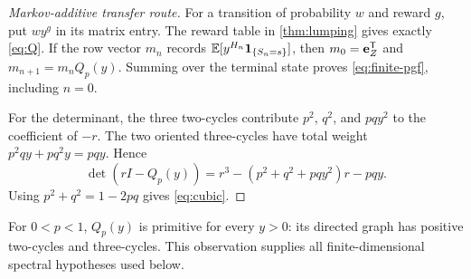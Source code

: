 \begin{proof}[Markov-additive transfer route]
For a transition of probability $w$ and reward $g$, put $wy^g$ in its
matrix entry.  The reward table in \cref{thm:lumping} gives exactly
\eqref{eq:Q}.  If the row vector $m_n$ records
$\mathbb{E}[y^{H_n}\mathbf 1_{\{S_n=s\}}]$, then
$m_0=\mathbf e_{Z}^{\mathsf T}$ and $m_{n+1}=m_nQ_p(y)$.  Summing over the terminal
state proves \eqref{eq:finite-pgf}, including $n=0$.

For the determinant, the three two-cycles contribute
$p^2$, $q^2$, and $pqy^2$ to the coefficient of $-r$.  The two oriented
three-cycles have total weight $p^2qy+pq^2y=pqy$.  Hence
\[
 \det(rI-Q_p(y))
 =r^3-(p^2+q^2+pqy^2)r-pqy.
\]
Using $p^2+q^2=1-2pq$ gives \eqref{eq:cubic}.
\end{proof}

For $0<p<1$, $Q_p(y)$ is primitive for every $y>0$: its directed graph has
positive two-cycles and three-cycles.  This observation supplies all
finite-dimensional spectral hypotheses used below.
